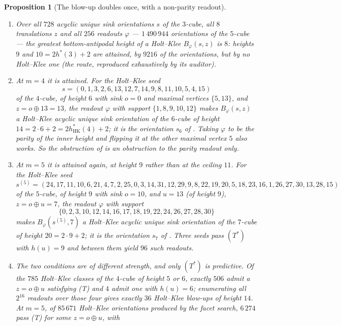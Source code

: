 \documentclass[11pt]{article}
\theoremstyle{plain}
\newtheorem{proposition}[theorem]{Proposition}
\theoremstyle{definition}
\begin{document}
\begin{proposition}[The blow-up doubles once, with a non-parity readout]\label{prop:hk-doubling-measured}
\begin{enumerate}
\item[(a)] Over all $728$ acyclic unique sink orientations $s$ of the
$3$-cube, all $8$ translations $z$ and all $256$ readouts $\varphi$
--- $1\,490\,944$ orientations of the $5$-cube --- the greatest
bottom-antipodal height of a Holt--Klee $B_\varphi(s,z)$ is $8$: heights
$9$ and $10=2h^{\ast}(3)+2$ are attained, by $9216$ of the orientations,
but by no Holt--Klee one (the route, reproduced exhaustively by its
auditor).
\item[(b)] At $m=4$ it is attained. For the Holt--Klee seed
\[
  s=(0,1,3,2,6,13,12,7,14,9,8,11,10,5,4,15)
\]
of the $4$-cube, of height $6$ with sink $o=0$ and maximal vertices
$\{5,13\}$, and $z=o\oplus13=13$, the readout $\varphi$ with support
$\{1,8,9,10,12\}$ makes $B_\varphi(s,z)$ a Holt--Klee acyclic unique sink
orientation of the $6$-cube of height $14=2\cdot6+2=
2h^{\ast}_{\mathrm{HK}}(4)+2$; it is the orientation $s_6$ of
. Taking $\varphi$ to be the parity of the inner
height and flipping it at the \emph{other} maximal vertex $5$ also works.
So the obstruction of  is an obstruction to the
parity readout only.
\item[(c)] At $m=5$ it is attained again, at height $9$ rather than at
the ceiling $11$. For the Holt--Klee seed
\[
 s^{(5)}=(24,17,11,10,6,21,4,7,2,25,0,3,14,31,12,29,
          9,8,22,19,20,5,18,23,16,1,26,27,30,13,28,15)
\]
of the $5$-cube, of height $9$ with sink $o=10$, and $u=13$ (of height
$9$), $z=o\oplus u=7$, the readout $\varphi$ with support
\[
 \{0,2,3,10,12,14,16,17,18,19,22,24,26,27,28,30\}
\]
makes $B_\varphi(s^{(5)},7)$ a Holt--Klee acyclic unique sink orientation
of the $7$-cube of height $20=2\cdot9+2$; it is the orientation $s_7$ of
. Three seeds pass $(T^{\ast})$ with $h(u)=9$ and
between them yield $96$ such readouts.
\item[(d)] The two conditions are of different strength, and only
$(T^{\ast})$ is predictive. Of the $785$ Holt--Klee classes of the
$4$-cube of height $5$ or $6$, exactly $506$ admit a $z=o\oplus u$
satisfying \emph{(T)} and $4$ admit one with $h(u)=6$; enumerating all
$2^{16}$ readouts over those four gives exactly $36$ Holt--Klee blow-ups
of height $14$. At $m=5$, of $85\,671$ Holt--Klee orientations produced by
the facet search, $6\,274$ pass \emph{(T)} for some $z=o\oplus u$, with

\end{enumerate}
\end{proposition}
\end{document}
